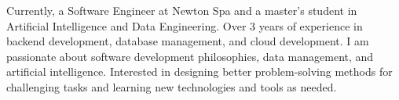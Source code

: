

\begin{cvparagraph}

    Currently, a Software Engineer at Newton Spa and a master's student in Artificial Intelligence and Data Engineering.
    Over 3 years of experience in backend development, database management, and cloud development.
    I am passionate about software development philosophies, data management, and artificial intelligence.
    Interested in designing better problem-solving methods for challenging tasks and learning new technologies and tools as needed.
\end{cvparagraph}
